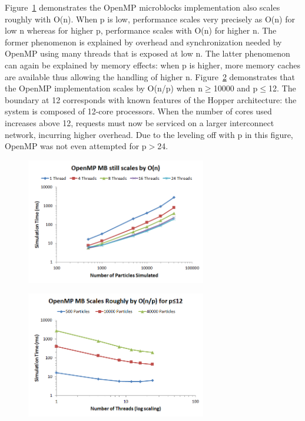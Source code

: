 \documentclass[11pt]{article} %
\begin{document}
Figure~\ref{openmp_mb_n}  demonstrates the OpenMP microblocks implementation also scales roughly with O(n). When p is low, performance scales very precisely as O(n) for low n whereas for higher p, performance scales with O(n) for higher n. The former phenomenon is explained by overhead and synchronization needed by OpenMP using many threads that is exposed at low n. The latter phenomenon can again be explained by memory effects: when p is higher, more memory caches are available thus allowing the handling of higher n. Figure~\ref{openmp_mb_p} demonstrates that the OpenMP implementation scales by O(n/p) when n$\geq$10000 and p$\leq$12. The boundary at 12 corresponds with known features of the Hopper architecture: the system is composed of 12-core processors. When the number of cores used increases above 12, requests must now be serviced on a larger interconnect network, incurring higher overhead. Due to the leveling off with p in this figure, OpenMP was not even attempted for p$>$24.

\begin{figure}[!h]
\centering
\includegraphics[width=0.7\textwidth]{figures/openmp_mb_n.png}
\caption{}
\label{openmp_mb_n}
\end{figure}

\begin{figure}[!h]
\centering
\includegraphics[width=0.7\textwidth]{figures/openmp_mb_p.png}
\caption{}
\label{openmp_mb_p}
\end{figure}
\end{document}
